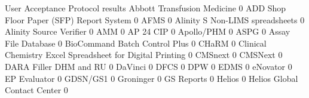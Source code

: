 \documentclass{article}
\begin{document}
\begin{Schunk}
\begin{Soutput}
                                                            User Acceptance Protocol results
  Abbott Transfusion Medicine                                                              0
  ADD Shop Floor Paper (SFP) Report System                                                 0
  AFMS                                                                                     0
  Alinity S Non-LIMS spreadsheets                                                          0
  Alinity Source Verifier                                                                  0
  AMM                                                                                      0
  AP 24 CIP                                                                                0
  Apollo/PHM                                                                               0
  ASPG                                                                                     0
  Assay File Database                                                                      0
  BioCommand Batch Control Plus                                                            0
  CHaRM                                                                                    0
  Clinical Chemistry Excel Spreadsheet for Digital Printing                                0
  CMSnext                                                                                  0
  CMSNext                                                                                  0
  DARA Filler DHM and RU                                                                   0
  DaVinci                                                                                  0
  DFCS                                                                                     0
  DPW                                                                                      0
  EDMS                                                                                     0
  eNovator                                                                                 0
  EP Evaluator                                                                             0
  GDSN/GS1                                                                                 0
  Groninger                                                                                0
  GS Reports                                                                               0
  Helios                                                                                   0
  Helios Global Contact Center                                                             0

\end{Soutput}
\end{Schunk}
\end{document}
